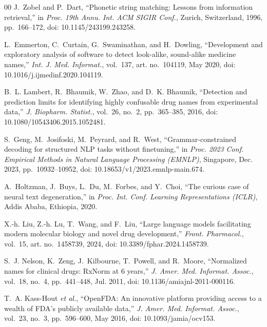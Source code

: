 \documentclass[conference]{IEEEtran}
\begin{document}
\begin{thebibliography}{00}
J.~Zobel and P.~Dart, ``Phonetic string matching: Lessons from information
retrieval,'' in \emph{Proc. 19th Annu. Int. ACM SIGIR Conf.}, Zurich, Switzerland, 1996,
pp.~166--172, doi: 10.1145/243199.243258.

L.~Emmerton, C.~Curtain, G.~Swaminathan, and H.~Dowling, ``Development and
exploratory analysis of software to detect look-alike, sound-alike medicine
names,'' \emph{Int. J. Med. Informat.}, vol.~137, art. no.~104119, May 2020, doi: 10.1016/j.ijmedinf.2020.104119.

B.~L. Lambert, R.~Bhaumik, W.~Zhao, and D.~K. Bhaumik, ``Detection and
prediction limits for identifying highly confusable drug names from experimental
data,'' \emph{J. Biopharm. Statist.}, vol.~26, no.~2, pp.~365--385, 2016, doi: 10.1080/10543406.2015.1052481.

S.~Geng, M.~Josifoski, M.~Peyrard, and R.~West, ``Grammar-constrained decoding
for structured NLP tasks without finetuning,'' in \emph{Proc. 2023 Conf.
Empirical Methods in Natural Language Processing (EMNLP)}, Singapore, Dec. 2023,
pp.~10932--10952, doi: 10.18653/v1/2023.emnlp-main.674.

A.~Holtzman, J.~Buys, L.~Du, M.~Forbes, and Y.~Choi, ``The curious case of
neural text degeneration,'' in \emph{Proc. Int. Conf. Learning Representations
(ICLR)}, Addis Ababa, Ethiopia, 2020.

X.-h. Liu, Z.-h. Lu, T.~Wang, and F.~Liu, ``Large language models facilitating
modern molecular biology and novel drug development,'' \emph{Front. Pharmacol.}, vol.~15, art. no.~1458739, 2024, doi: 10.3389/fphar.2024.1458739.

S.~J. Nelson, K.~Zeng, J.~Kilbourne, T.~Powell, and R.~Moore, ``Normalized names
for clinical drugs: RxNorm at 6 years,'' \emph{J. Amer. Med. Informat. Assoc.}, vol.~18, no.~4, pp.~441--448, Jul. 2011,
doi: 10.1136/amiajnl-2011-000116.

T.~A. Kass-Hout \emph{et al.}, ``OpenFDA: An innovative platform providing
access to a wealth of FDA's publicly available data,'' \emph{J. Amer. Med. Informat. Assoc.}, vol.~23, no.~3, pp.~596--600, May 2016,
doi: 10.1093/jamia/ocv153.

\end{thebibliography}
\end{document}
